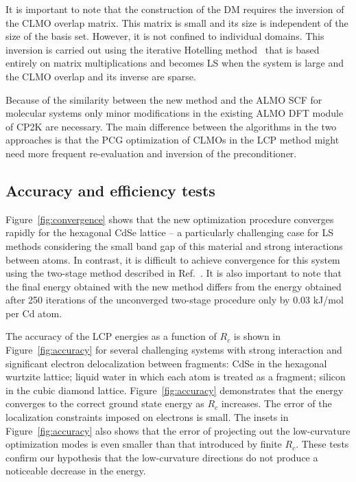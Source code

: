 \documentclass[aps,prl,twocolumn,reprint,amsmath,amssymb]{revtex4-1}
\begin{document}
It is important to note that the construction of the DM requires the inversion of the CLMO overlap matrix. 
This matrix is small and its size is independent of the size of the basis set. 
However, it is not confined to individual domains. This inversion is carried out using the iterative Hotelling method~\cite{hotelling1943some} that is based entirely on matrix multiplications and becomes LS when the system is large and the CLMO overlap and its inverse are sparse. 

Because of the similarity between the new method and the ALMO SCF for molecular systems only minor modifications in the existing ALMO DFT module of CP2K are necessary. The main difference between the algorithms in the two approaches is that the PCG optimization of CLMOs in the LCP method might need more frequent re-evaluation and inversion of the preconditioner.


\subsection{Accuracy and efficiency tests}


Figure~\ref{fig:convergence} shows that the new optimization procedure converges rapidly for the hexagonal CdSe lattice -- a particularly challenging case for LS methods considering the small band gap of this material and strong interactions between atoms. 
In contrast, it is difficult to achieve convergence for this system using the two-stage method described in Ref.~\cite{khaliullin2013efficient}. 
It is also important to note that the final energy obtained with the new method differs from the energy obtained after 250 iterations  of the unconverged two-stage procedure only by 0.03 kJ/mol per Cd atom. 


The accuracy of the LCP energies as a function of $R_c$ is shown in Figure~\ref{fig:accuracy} for several challenging systems with strong interaction and significant electron delocalization between fragments: CdSe in the hexagonal wurtzite lattice; liquid water in which each atom is treated as a fragment; silicon in the cubic diamond lattice. 
Figure~\ref{fig:accuracy} demonstrates that the energy converges to the correct ground state energy as $R_c$ increases. The error of the localization constraints imposed on electrons is small. The insets in Figure~\ref{fig:accuracy} also shows that the error of projecting out the low-curvature optimization modes is even smaller than that introduced by finite $R_c$. These tests confirm our hypothesis that the low-curvature directions do not produce a noticeable decrease in the energy.
\end{document}
